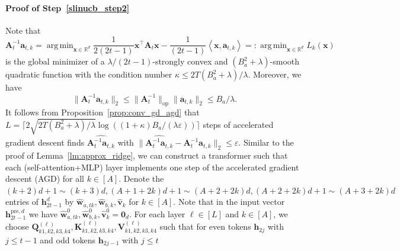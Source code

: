 \documentclass[10pt]{article}
\renewcommand{\hat}{\widehat}
\newcommand{\eps}{\varepsilon}
\DeclareMathOperator*{\argmin}{arg\,min}
\newcommand{\lops}[1]{\|{#1}\|_{\mathrm{op}}}
\newcommand{\<}{\left\langle}
\renewcommand{\>}{\right\rangle}
\renewcommand{\bQ}{\mathbf{Q}}
\newcommand{\bzero}{{\mathbf 0}}
\newcommand{\R}{\mathbb{R}}
\newcommand{\pre}{{\mathrm{pre}}}
\newcommand{\partd}{{d}}
\def\bA{{\mathbf A}}
\def\bK{{\mathbf K}}
\def\bQ{{\mathbf Q}}
\def\bV{{\mathbf V}}
\def\ba{{\mathbf a}}
\def\bh{{\mathbf h}}
\def\bv{{\mathbf v}}
\def\bw{{\mathbf w}}
\def\bx{{\mathbf x}}
\begin{document}
\paragraph{Proof of Step~\ref{slinucb_step2}}
Note that $$\bA_{t}^{-1}\ba_{t,k}=\argmin_{\bx\in\R^d}\frac{1}{2(2t-1)}\bx^\top\bA_t\bx-\frac{1}{(2t-1)}\<\bx,\ba_{t,k}\>=:\argmin_{\bx\in\R^d}L_k(\bx)$$ is the global minimizer of a $\lambda/(2t-1)$-strongly convex  and $(B_a^2+\lambda)$-smooth  quadratic function with the condition number $\kappa\leq 2T(B_a^2+\lambda)/\lambda$. Moreover, we have $$\|\bA_{t}^{-1}\ba_{t,k}\|_2\leq \lops{\bA_{t}^{-1}}\|\ba_{t,k}\|_2\leq B_a/\lambda.$$ It follows from  Proposition~\ref{prop:conv_gd_agd} that $L=\lceil2\sqrt{2 T(B_a^2+\lambda)/\lambda}\log((1+\kappa)B_a/(\lambda\eps))\rceil$ steps of accelerated gradient descent finds $\widehat{\bA_{t}^{-1}\ba_{t,k}}$   with $\|\widehat{\bA_{t}^{-1}\ba_{t,k}}-\bA_{t}^{-1}\ba_{t,k}\|_2\leq\eps$.
Similar to the proof of Lemma~\ref{lm:approx_ridge}, we can construct a transformer such that each (self-attention+MLP) layer implements one step of the accelerated gradient descent (AGD) for all $k\in[A]$. Denote the $(k+2)d+1\sim (k+3)d, (A+1+2k)d+1\sim (A+2+2k)d, (A+2+2k)d+1\sim (A+3+2k)d$ entries of  $\bh_{2t-1}^{\partd}$ by $\hat\bw_{a,tk},\hat\bw_{b,k},\hat\bv_{k}$ for $k\in[A]$. Note that in the input vector $\bh_{2t-1}^{\pre,\partd}$ we have $\hat\bw^0_{a,tk},\hat\bw^0_{b,k},\hat\bv^0_{k}=\bzero_d$.
For each layer $\ell\in[L]$ and $k\in[A]$, we choose
$\bQ_{k1,k2,k3,k4}^{(\ell)},\bK_{k1,k2,k3,k4}^{(\ell)},\bV_{k1,k2,k3,k4}^{(\ell)}$ such that for even tokens $\bh_{2j}$ with $j\leq t-1$ and odd tokens $\bh_{2j-1}$ with $j\leq t$
\end{document}
